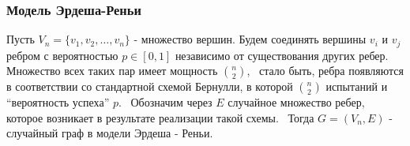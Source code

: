 \frametitle{Модель Эрдеша-Реньи} 


\begin{rdefinition}    
    Пусть $V_n = \{v_1, v_2, \dots, v_n\}$ - множество вершин. 
    Будем соединять вершины $v_i$ и $v_j$ ребром с вероятностью $p \in [0, 1]$ независимо от существования других ребер.  
    Множество всех таких пар имеет мощность $\binom{n}{2}$, \
    стало быть, ребра появляются в соответствии со стандартной схемой Бернулли, в которой  $\binom{n}{2}$ испытаний и “вероятность успеха” $p$. \
    Обозначим через $E$ случайное множество ребер, которое возникает в результате реализации такой схемы. \
    Тогда $G = (V_n, E)$ - случайный граф в модели Эрдеша - Реньи.
\end{rdefinition}
